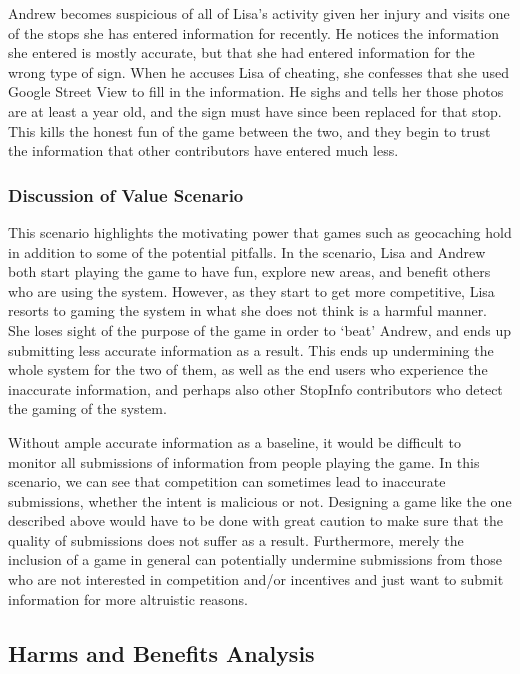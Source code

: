 Andrew becomes suspicious of all of Lisa's activity given her injury and visits one of the stops she has entered information for recently. He notices the information she entered is mostly accurate, but that she had entered information for the wrong type of sign. When he accuses Lisa of cheating, she confesses that she used Google Street View to fill in the information. He sighs and tells her those photos are at least a year old, and the sign must have since been replaced for that stop. This kills the honest fun of the game between the two, and they begin to trust the information that other contributors have entered much less. 

\subsubsection{Discussion of Value Scenario}
This scenario highlights the motivating power that games such as geocaching hold in addition to some of the potential pitfalls. In the scenario, Lisa and Andrew both start playing the game to have fun, explore new areas, and benefit others who are using the system. However, as they start to get more competitive, Lisa resorts to gaming the system in what she does not think is a harmful manner. She loses sight of the purpose of the game in order to `beat' Andrew, and ends up submitting less accurate information as a result. This ends up undermining the whole system for the two of them, as well as the end users who experience the inaccurate information, and perhaps also other StopInfo contributors who detect the gaming of the system.

Without ample accurate information as a baseline, it would be difficult to monitor all submissions of information from people playing the game. In this scenario, we can see that competition can sometimes lead to inaccurate submissions, whether the intent is malicious or not. Designing a game like the one described above would have to be done with great caution to make sure that the quality of submissions does not suffer as a result. Furthermore, merely the inclusion of a game in general can potentially undermine submissions from those who are not interested in competition and/or incentives and just want to submit information for more altruistic reasons. 

\subsection{Harms and Benefits Analysis}

